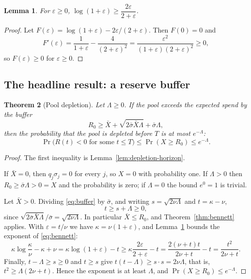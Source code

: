 \documentclass[11pt,a4paper]{article}
\newtheorem{theorem}{Theorem}
\newtheorem{lemma}[theorem]{Lemma}
\begin{document}
\begin{lemma}\label{lem:log}
For $\varepsilon\ge0$, $\log(1+\varepsilon)\ge\dfrac{2\varepsilon}{2+\varepsilon}$.
\end{lemma}
\begin{proof}
Let $F(\varepsilon)=\log(1+\varepsilon)-2\varepsilon/(2+\varepsilon)$. Then $F(0)=0$ and
\begin{equation}
F'(\varepsilon)=\frac1{1+\varepsilon}-\frac4{(2+\varepsilon)^2}=\frac{\varepsilon^2}{(1+\varepsilon)(2+\varepsilon)^2}\ge0,
\end{equation}
so $F(\varepsilon)\ge0$ for $\varepsilon\ge0$.
\end{proof}

\subsection{The headline result: a reserve buffer}
\begin{theorem}[Pool depletion]\label{thm:depletion}
Let $\Lambda\ge0$. If the pool exceeds the expected spend by the buffer
\begin{equation}
\boxed{R_0\ge\bar X+\sqrt{2\bar\sigma\bar X\Lambda}+\bar\sigma\Lambda,}\label{eq:buffer}
\end{equation}
then the probability that the pool is depleted before $T$ is at most $e^{-\Lambda}$:
\begin{equation}
\Pr\big(R(t)<0\text{ for some }t\le T\big)\le\Pr(X\ge R_0)\le e^{-\Lambda}.
\end{equation}
\end{theorem}
\begin{proof}
The first inequality is Lemma~\ref{lem:depletion-horizon}.

If $\bar X=0$, then $q_j\sigma_j=0$ for every $j$, so $X=0$ with probability one. If $\Lambda>0$ then $R_0\ge\bar\sigma\Lambda>0=X$ and the probability is zero; if $\Lambda=0$ the bound $e^{0}=1$ is trivial.

Let $\bar X>0$. Dividing \eqref{eq:buffer} by $\bar\sigma$, and writing $s=\sqrt{2\nu\Lambda}$ and $t=\kappa-\nu$,
\begin{equation}
t\ge s+\Lambda\ge0,
\end{equation}
since $\sqrt{2\bar\sigma\bar X\Lambda}/\bar\sigma=\sqrt{2\nu\Lambda}$. In particular $\bar X\le R_0$, and Theorem~\ref{thm:bennett} applies. With $\varepsilon=t/\nu$ we have $\kappa=\nu(1+\varepsilon)$, and Lemma~\ref{lem:log} bounds the exponent of \eqref{eq:bennett}:
\begin{equation}
\kappa\log\frac{\kappa}{\nu}-\kappa+\nu=\kappa\log(1+\varepsilon)-t\ge\kappa\frac{2\varepsilon}{2+\varepsilon}-t=\frac{2(\nu+t)t}{2\nu+t}-t=\frac{t^2}{2\nu+t}.
\end{equation}
Finally, $t-\Lambda\ge s\ge0$ and $t\ge s$ give $t(t-\Lambda)\ge s\cdot s=2\nu\Lambda$, that is, $t^2\ge\Lambda(2\nu+t)$. Hence the exponent is at least $\Lambda$, and $\Pr(X\ge R_0)\le e^{-\Lambda}$.
\end{proof}
\end{document}
